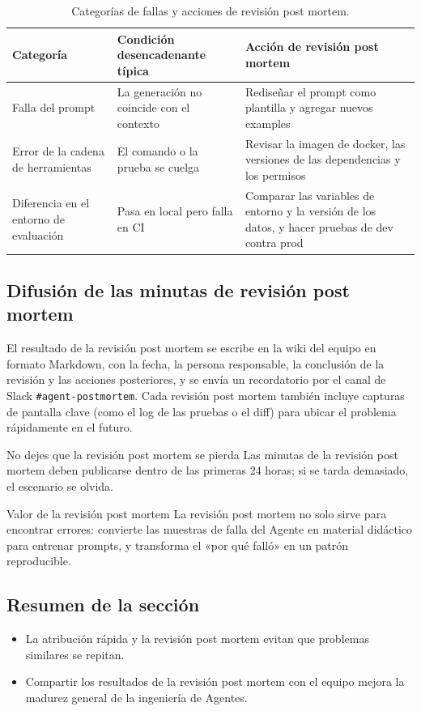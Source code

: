 \documentclass[a4paper]{article}
\begin{document}
\begin{table}[H]
\centering
\begin{tabular}{p{} p{} p{}}
\toprule
Categoría & Condición desencadenante típica & Acción de revisión post mortem \\
\midrule
Falla del prompt & La generación no coincide con el contexto & Rediseñar el prompt como plantilla y agregar nuevos examples \\
\midrule
Error de la cadena de herramientas & El comando o la prueba se cuelga & Revisar la imagen de docker, las versiones de las dependencias y los permisos \\
\midrule
Diferencia en el entorno de evaluación & Pasa en local pero falla en CI & Comparar las variables de entorno y la versión de los datos, y hacer pruebas de dev contra prod \\
\bottomrule
\end{tabular}
\caption{Categorías de fallas y acciones de revisión post mortem.}
\end{table}

\subsection{Difusión de las minutas de revisión post mortem}
El resultado de la revisión post mortem se escribe en la wiki del equipo en formato Markdown, con la fecha, la persona responsable, la conclusión de la revisión y las acciones posteriores, y se envía un recordatorio por el canal de Slack \texttt{\#agent-postmortem}. Cada revisión post mortem también incluye capturas de pantalla clave (como el log de las pruebas o el diff) para ubicar el problema rápidamente en el futuro.

\begin{warningbox}{No dejes que la revisión post mortem se pierda}
Las minutas de la revisión post mortem deben publicarse dentro de las primeras 24 horas; si se tarda demasiado, el escenario se olvida.
\end{warningbox}

\begin{knowledgebox}{Valor de la revisión post mortem}
La revisión post mortem no solo sirve para encontrar errores: convierte las muestras de falla del Agente en material didáctico para entrenar prompts, y transforma el «por qué falló» en un patrón reproducible.
\end{knowledgebox}

\subsection{Resumen de la sección}
\begin{itemize}
    \item La atribución rápida y la revisión post mortem evitan que problemas similares se repitan.
    \item Compartir los resultados de la revisión post mortem con el equipo mejora la madurez general de la ingeniería de Agentes.
\end{itemize}
\end{document}

